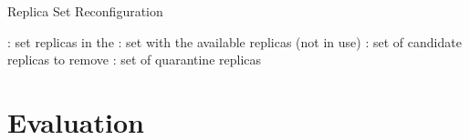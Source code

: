 {\centering
\begin{minipage}{.7\linewidth}
  \begin{algorithm}[H]
\caption{Replica Set Reconfiguration}\label{alg:algorithm2}
{\footnotesize
\ES: set replicas in the \configuration \;
\RS: set with the available replicas (not in use)\;
\MAX: set of candidate replicas to remove\;
\QS: set of quarantine replicas\;

\BlankLine
{}
}
\end{algorithm}

\end{minipage}
\par
}


\section{Evaluation}
\label{sec:diversity}


